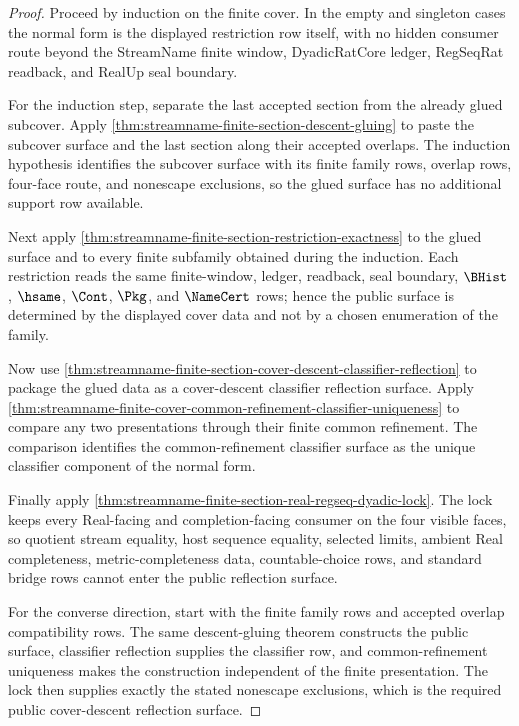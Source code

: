 \begin{proof}
Proceed by induction on the finite cover. In the empty and singleton cases the
normal form is the displayed restriction row itself, with no hidden consumer
route beyond the StreamName finite window, DyadicRatCore ledger, RegSeqRat
readback, and RealUp seal boundary.

For the induction step, separate the last accepted section from the already
glued subcover. Apply
\autoref{thm:streamname-finite-section-descent-gluing} to paste the subcover
surface and the last section along their accepted overlaps. The induction
hypothesis identifies the subcover surface with its finite family rows,
overlap rows, four-face route, and nonescape exclusions, so the glued surface
has no additional support row available.

Next apply \autoref{thm:streamname-finite-section-restriction-exactness} to
the glued surface and to every finite subfamily obtained during the induction.
Each restriction reads the same finite-window, ledger, readback, seal
boundary, $\BHist$, $\hsame$, $\Cont$, $\Pkg$, and $\NameCert$ rows; hence the
public surface is determined by the displayed cover data and not by a chosen
enumeration of the family.

Now use
\autoref{thm:streamname-finite-section-cover-descent-classifier-reflection} to
package the glued data as a cover-descent classifier reflection surface. Apply
\autoref{thm:streamname-finite-cover-common-refinement-classifier-uniqueness}
to compare any two presentations through their finite common refinement. The
comparison identifies the common-refinement classifier surface as the unique
classifier component of the normal form.

Finally apply
\autoref{thm:streamname-finite-section-real-regseq-dyadic-lock}. The lock
keeps every Real-facing and completion-facing consumer on the four visible
faces, so quotient stream equality, host sequence equality, selected limits,
ambient Real completeness, metric-completeness data, countable-choice rows,
and standard bridge rows cannot enter the public reflection surface.

For the converse direction, start with the finite family rows and accepted
overlap compatibility rows. The same descent-gluing theorem constructs the
public surface, classifier reflection supplies the classifier row, and
common-refinement uniqueness makes the construction independent of the finite
presentation. The lock then supplies exactly the stated nonescape exclusions,
which is the required public cover-descent reflection surface.
\end{proof}

